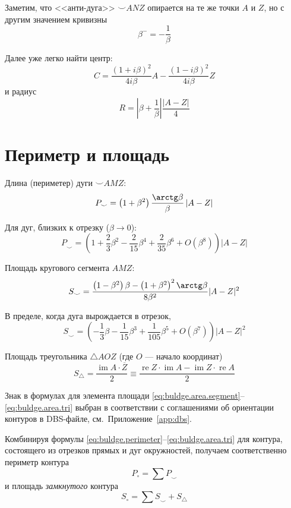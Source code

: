 Заметим, что <<анти-дуга>>
${\smile} ANZ$
опирается на те же точки
$A$ и $Z$,
но с другим значением кривизны
$$
\beta^- = -\frac{1}{\beta}
$$

Далее уже легко найти центр:
$$
C =
\frac{(1+i\beta)^2}{4i\beta}A
-
\frac{(1-i\beta)^2}{4i\beta}Z
$$
и радиус
$$
R = \left| \beta + \frac{1}\beta \right|
\frac{\left|A-Z \right|}4
$$

\section*{Периметр и площадь}

Длина
(периметер)
дуги
${\smile}AMZ$:
\begin{equation}
  \label{eq:buldge.perimeter}
  P_{\smile} =
  \left(1+\beta^2 \right)
  \frac{\arctg \beta}{\beta}
  \left| A - Z \right|
\end{equation}

Для дуг, близких к отрезку
($\beta \to 0$):
$$
P_{\smile} =
 \left(1+\frac{2}{3}\beta^2 - \frac{2}{15}\beta^4 + \frac{2}{35}\beta^6 +O(\beta^8)\right)
 \left| A - Z \right|
$$

Площадь кругового сегмента
$AMZ$:
\begin{equation}
  \label{eq:buldge.area.segment}
  S_{\smile}=
  \frac{\left(1 - \beta^2\right) \beta - \left(1+\beta^2\right)^2\arctg \beta}{8\beta^2}
  |A-Z|^2
\end{equation}

В пределе,
когда дуга вырождается в отрезок,
$$
S_{\smile}=
  \left(
    -\frac{1}{3} \beta - \frac{1}{15}\beta^3 +\frac{1}{105}\beta^5 + O(\beta^7)
  \right)|A-Z|^2
$$

Площадь треугольника
$\triangle AOZ$
(где $O$ --- начало координат)
\begin{equation}
  \label{eq:buldge.area.tri}
  S_{\triangle} =
  \frac{\operatorname{im}A\cdot\overline Z}{2}
  \equiv
  \frac{\operatorname{re} Z \cdot \operatorname{im} A - \operatorname{im} Z \cdot \operatorname{re} A}2
\end{equation}

Знак в формулах для элемента площади
\eqref{eq:buldge.area.segment}--\eqref{eq:buldge.area.tri}
выбран в соответствии с соглашениями об ориентации контуров
в DBS-файле,
см.~Приложение~\ref{app:dbs}.

Комбинируя формулы
\eqref{eq:buldge.perimeter}--\eqref{eq:buldge.area.tri}
для контура,
состоящего из отрезков прямых и дуг окружностей,
получаем соответственно периметр контура
$$
P_{\circ} =  \sum P_{\smile}
$$
и площадь
\textit{замкнутого}
контура
$$
S_{\circ} = \sum S_{\smile} + S_{\triangle}
$$


